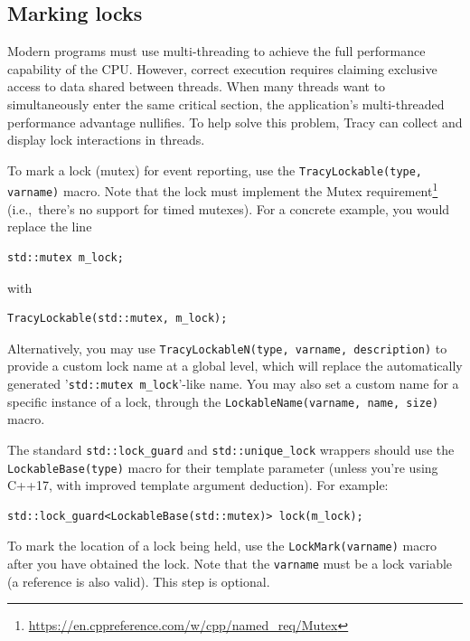 \documentclass[hidelinks,titlepage,a4paper]{article}
\begin{document}
\subsection{Marking locks}

Modern programs must use multi-threading to achieve the full performance capability of the CPU. However, correct execution requires claiming exclusive access to data shared between threads. When many threads want to simultaneously enter the same critical section, the application's multi-threaded performance advantage nullifies. To help solve this problem, Tracy can collect and display lock interactions in threads.

To mark a lock (mutex) for event reporting, use the \texttt{TracyLockable(type, varname)} macro. Note that the lock must implement the Mutex requirement\footnote{\url{https://en.cppreference.com/w/cpp/named_req/Mutex}} (i.e.,\ there's no support for timed mutexes). For a concrete example, you would replace the line

\begin{lstlisting}
std::mutex m_lock;
\end{lstlisting}

with

\begin{lstlisting}
TracyLockable(std::mutex, m_lock);
\end{lstlisting}

Alternatively, you may use \texttt{TracyLockableN(type, varname, description)} to provide a custom lock name at a global level, which will replace the automatically generated '\texttt{std::mutex m\_lock}'-like name. You may also set a custom name for a specific instance of a lock, through the \texttt{LockableName(varname, name, size)} macro.

The standard \texttt{std::lock\_guard} and \texttt{std::unique\_lock} wrappers should use the \texttt{LockableBase(type)} macro for their template parameter (unless you're using C++17, with improved template argument deduction). For example:

\begin{lstlisting}
std::lock_guard<LockableBase(std::mutex)> lock(m_lock);
\end{lstlisting}

To mark the location of a lock being held, use the \texttt{LockMark(varname)} macro after you have obtained the lock. Note that the \texttt{varname} must be a lock variable (a reference is also valid). This step is optional.
\end{document}
